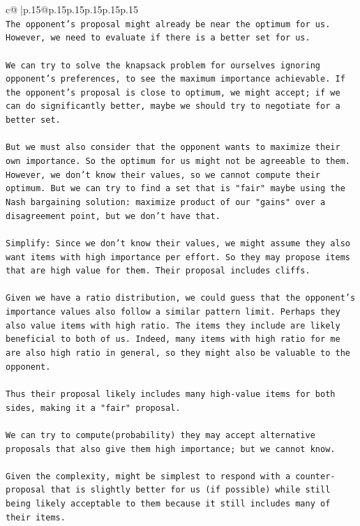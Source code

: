 \documentclass{article}
\begin{document}
{\begin{supertabular}{c@{$\;$}|p{.15\linewidth}@{}p{.15\linewidth}p{.15\linewidth}p{.15\linewidth}p{.15\linewidth}p{.15\linewidth}}
{{{\\ 
\texttt{The opponent's proposal might already be near the optimum for us. However, we need to evaluate if there is a better set for us.} \\
\\ 
\texttt{We can try to solve the knapsack problem for ourselves ignoring opponent's preferences, to see the maximum importance achievable. If the opponent's proposal is close to optimum, we might accept; if we can do significantly better, maybe we should try to negotiate for a better set.} \\
\\ 
\texttt{But we must also consider that the opponent wants to maximize their own importance. So the optimum for us might not be agreeable to them. However, we don't know their values, so we cannot compute their optimum. But we can try to find a set that is "fair" maybe using the Nash bargaining solution: maximize product of our "gains" over a disagreement point, but we don't have that.} \\
\\ 
\texttt{Simplify: Since we don't know their values, we might assume they also want items with high importance per effort. So they may propose items that are high value for them. Their proposal includes cliffs.} \\
\\ 
\texttt{Given we have a ratio distribution, we could guess that the opponent's importance values also follow a similar pattern limit. Perhaps they also value items with high ratio. The items they include are likely beneficial to both of us. Indeed, many items with high ratio for me are also high ratio in general, so they might also be valuable to the opponent.} \\
\\ 
\texttt{Thus their proposal likely includes many high{-}value items for both sides, making it a "fair" proposal.} \\
\\ 
\texttt{We can try to compute(probability) they may accept alternative proposals that also give them high importance; but we cannot know.} \\
\\ 
\texttt{Given the complexity, might be simplest to respond with a counter{-}proposal that is slightly better for us (if possible) while still being likely acceptable to them because it still includes many of their items.} \\
\\ 
}}}
\end{supertabular}}
\end{document}
